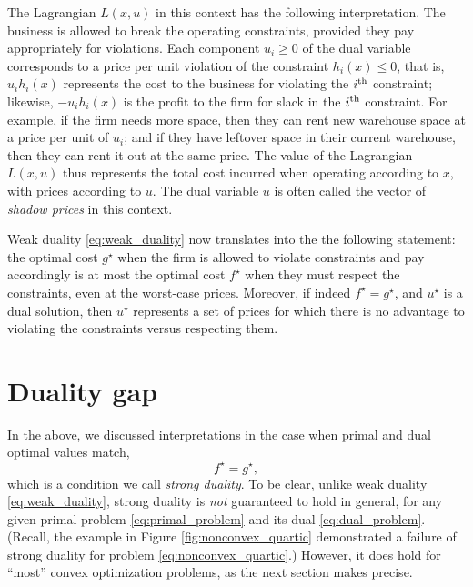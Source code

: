 The Lagrangian $L(x,u)$ in this context has the following interpretation. The
business is allowed to break the operating constraints, provided they pay
appropriately for violations. Each component $u_i \geq 0$ of the dual variable
corresponds to a price per unit violation of the constraint $h_i(x) \leq 0$,
that is, $u_i h_i(x)$ represents the cost to the business for violating the
$i^{\textnormal{th}}$ constraint; likewise, $-u_i h_i(x)$ is the profit to the firm for slack
in the $i^{\textnormal{th}}$ constraint. For example, if the firm needs more space, then they
can rent new warehouse space at a price per unit of $u_i$; and if they have
leftover space in their current warehouse, then they can rent it out at the same 
price. The value of the Lagrangian $L(x,u)$ thus represents the total cost
incurred when operating according to $x$, with prices according to $u$. The dual  
variable $u$ is often called the vector of \emph{shadow prices} in this
context. 

Weak duality \eqref{eq:weak_duality} now translates into the the following
statement: the optimal cost $g^\star$ when the firm is allowed to violate
constraints and pay accordingly is at most the optimal cost $f^\star$ when they
must respect the constraints, even at the worst-case prices. Moreover, if indeed
$f^\star = g^\star$, and $u^\star$ is a dual solution, then $u^\star$ represents
a set of prices for which there is no advantage to violating the constraints
versus respecting them.  

\section{Duality gap}

In the above, we discussed interpretations in the case when primal and dual 
optimal values match,       
\begin{equation}
\label{eq:strong_duality}
f^\star = g^\star,
\end{equation}
which is a condition we call \emph{strong duality}. To be clear, unlike weak
duality \eqref{eq:weak_duality}, strong duality is \emph{not} guaranteed to hold
in general, for any given primal problem \eqref{eq:primal_problem} and its dual  
\eqref{eq:dual_problem}. (Recall, the example in Figure
\ref{fig:nonconvex_quartic} demonstrated a failure of strong duality for problem
\eqref{eq:nonconvex_quartic}.) However, it does hold for ``most'' convex
optimization problems, as the next section makes precise. 


